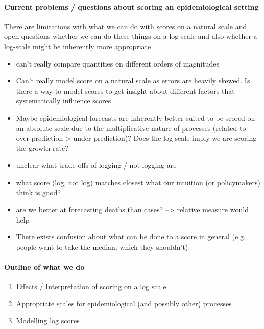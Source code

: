 \documentclass{article}
\begin{document}
\paragraph{Current problems / questions about scoring an epidemiological setting}
There are limitations with what we can do with scores on a natural scale and open questions whether we can do these things on a log-scale and also whether a log-scale might be inherently more appropriate
\begin{itemize}
    \item can't really compare quantities on different orders of magnitudes
    \item Can't really model score on a natural scale as errors are heavily skewed. Is there a way to model scores to get insight about different factors that systematically influence scores
    \item Maybe epidemiological forecasts are inherently better suited to be scored on an absolute scale due to the multiplicative nature of processes (related to over-prediction > under-prediction)? Does the log-scale imply we are scoring the growth rate? 
    \item unclear what trade-offs of logging / not logging are
    \item what score (log, not log) matches closest what our intuition (or policymakers) think is good? 
    \item are we better at forecasting deaths than cases? --> relative measure would help
    \item There exists confusion about what can be done to a score in general (e.g. people want to take the median, which they shouldn't) %
\end{itemize}

\paragraph{Outline of what we do}

\begin{enumerate}
    \item Effects / Interpretation of scoring on a log scale
    \item Appropriate scales for epidemiological (and possibly other) processes
    \item Modelling log scores
\end{enumerate}

\end{document}
